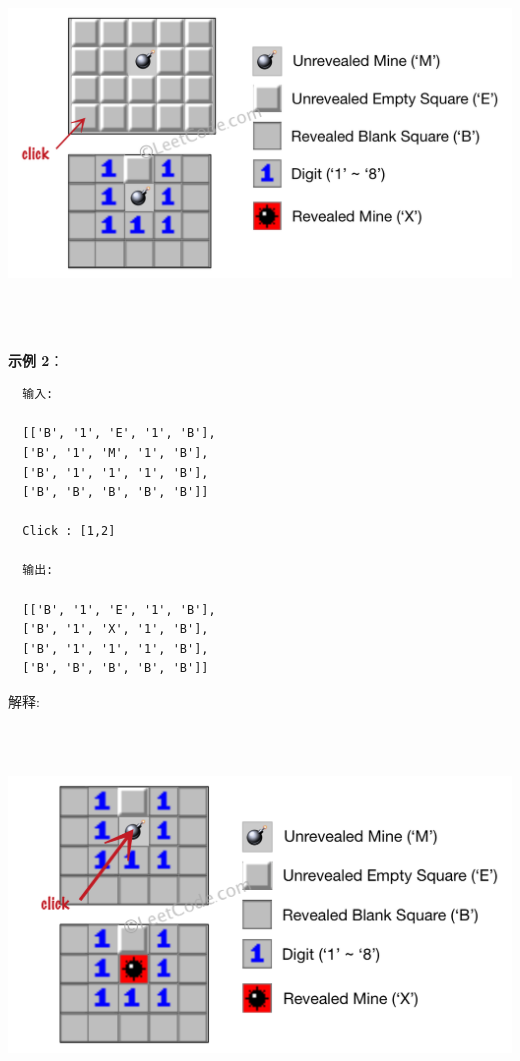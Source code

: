 \includegraphics[width=150mm,height=100mm]{images/leetcode/minesweeper_example_1.png}

\textbf{示例 2}：

\begin{verbatim}
  输入: 

  [['B', '1', 'E', '1', 'B'],
  ['B', '1', 'M', '1', 'B'],
  ['B', '1', '1', '1', 'B'],
  ['B', 'B', 'B', 'B', 'B']]

  Click : [1,2]

  输出: 

  [['B', '1', 'E', '1', 'B'],
  ['B', '1', 'X', '1', 'B'],
  ['B', '1', '1', '1', 'B'],
  ['B', 'B', 'B', 'B', 'B']]
\end{verbatim}

解释:

\includegraphics[width=150mm,height=100mm]{images/leetcode/minesweeper_example_2.png}

